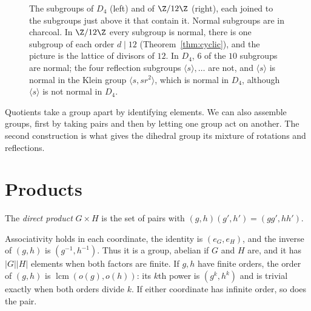 \begin{figure}[ht]
\centering
{}
\caption{The subgroups of $D_4$ (left) and of $\Z/12\Z$ (right), each joined to the subgroups just above it that contain it. Normal subgroups are in charcoal. In $\Z/12\Z$ every subgroup is normal, there is one subgroup of each order $d\mid12$ (Theorem~\ref{thm:cyclic}), and the picture is the lattice of divisors of $12$. In $D_4$, $6$ of the $10$ subgroups are normal; the four reflection subgroups $\langle s\rangle,\dots$ are not, and $\langle s\rangle$ is normal in the Klein group $\langle s,sr^2\rangle$, which is normal in $D_4$, although $\langle s\rangle$ is not normal in $D_4$.}
\label{fig:lattices}
\end{figure}

Quotients take a group apart by identifying elements. We can also assemble groups, first by taking pairs and then by letting one group act on another. The second construction is what gives the dihedral group its mixture of rotations and reflections.

\section{Products}

\begin{definition}
The \emph{direct product} $G\times H$ is the set of pairs with $(g,h)(g',h')=(gg',hh')$.
\end{definition}

Associativity holds in each coordinate, the identity is $(e_G,e_H)$, and the inverse of $(g,h)$ is $(g^{-1},h^{-1})$. Thus it is a group, abelian if $G$ and $H$ are, and it has $|G||H|$ elements when both factors are finite. If $g,h$ have finite orders, the order of $(g,h)$ is $\operatorname{lcm}(o(g),o(h))$: its $k$th power is $(g^k,h^k)$ and is trivial exactly when both orders divide $k$. If either coordinate has infinite order, so does the pair.


